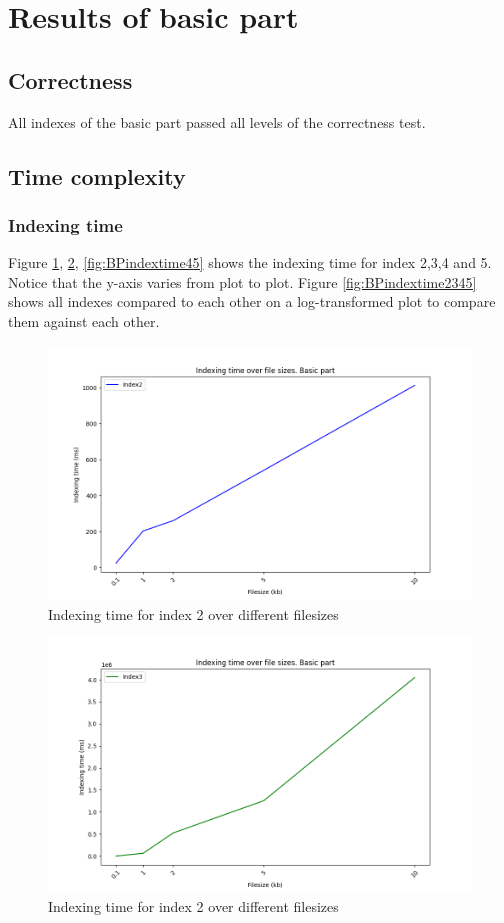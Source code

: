 \section{Results of basic part}
\subsection{Correctness}
All indexes  of the basic part passed all levels of the correctness test.

\subsection{Time complexity}
\subsubsection{Indexing time}
Figure \ref{fig:BPindextime2}, \ref{fig:BPindextime3}, \ref{fig:BPindextime45} shows the indexing time for index 2,3,4 and 5. Notice that the y-axis varies from plot to plot. Figure \ref{fig:BPindextime2345} shows all indexes compared to each other on a log-transformed plot to compare them against each other.

\begin{figure}[H]
    \centering
    \includegraphics[width=.8\textwidth]{LaTeX/Figures/BasicPart/BPIndexing[2].png}
    \caption{Indexing time for index 2 over different filesizes}
    \label{fig:BPindextime2}
\end{figure}

\begin{figure}[H]
    \centering
    \includegraphics[width=.8\textwidth]{LaTeX/Figures/BasicPart/BPIndexing[3].png}
    \caption{Indexing time for index 2 over different filesizes}
    \label{fig:BPindextime3}
\end{figure}

